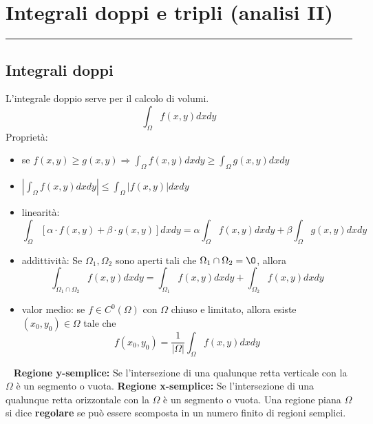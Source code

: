\section{Integrali doppi e tripli (analisi II)}
\rule{\textwidth}{2pt}
\subsection{Integrali doppi}
L'integrale doppio serve per il calcolo di volumi.\newline
\[
    \int_{\Omega} f(x,y) dxdy
\]
Proprietà:
\begin{itemize}
    \item se $f(x,y)\geq g(x,y) \Rightarrow \int_\Omega f(x,y) dxdy \geq \int_{\Omega} g(x,y)dxdy$
    \item $|\int_{\Omega}f(x,y) dxdy| \leq \int_{\Omega}|f(x,y)|dxdy$
    \item linearità:
    \[
        \int_{\Omega}[\alpha \cdot f(x,y) + \beta \cdot g(x,y)]dxdy = \alpha \int_{\Omega} f(x,y) dxdy + \beta \int_{\Omega} g(x,y) dxdy
    \]
    \item addittività: Se $\Omega_1, \Omega_2$ sono aperti tali che $\Omega_1 \cap \Omega_2 = \O$, allora
    \[
        \int_{\Omega_1 \cap \Omega_2}f(x,y)dxdy = \int_{\Omega_1} f(x,y) dxdy + \int_{\Omega_2} f(x,y) dxdy
    \]
    \item valor medio: se $f \in C^0(\Omega)$ con $\Omega$ chiuso e limitato, allora esiste $(x_0, y_0) \in\Omega$ tale che 
    \[
        f(x_0, y_0) = \frac{1}{|\Omega|}\int_{\Omega}f(x,y)dxdy
    \]
\end{itemize}
\ \newline
\textbf{Regione y-semplice:} Se l'intersezione di una qualunque retta verticale con la $\Omega$ è un segmento o vuota.\newline
\textbf{Regione x-semplice:} Se l'intersezione di una qualunque retta orizzontale con la $\Omega$ è un segmento o vuota.\newline
\newline
Una regione piana $\Omega$ si dice \textbf{regolare} se può essere scomposta in un numero finito di regioni semplici.
